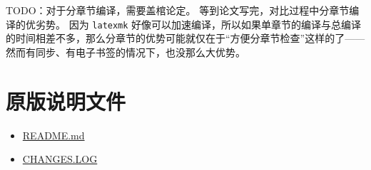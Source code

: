 \documentclass[../Main/thesis.tex]{subfiles}
\begin{document}
TODO：对于分章节编译，需要盖棺论定。
等到论文写完，对比过程中分章节编译的优劣势。 因为 \texttt{latexmk}
好像可以加速编译，所以如果单章节的编译与总编译的时间相差不多，那么分章节的优势可能就仅在于``方便分章节检查''这样的了------然而有同步、有电子书签的情况下，也没那么大优势。

\section{原版说明文件}

\begin{itemize}
\item
  \href{https://github.com/marquistj13/TongjiThesis/blob/master/README.md}{README.md}
\item
  \href{https://github.com/marquistj13/TongjiThesis/blob/master/changes.md}{CHANGES.LOG}
\end{itemize}
\end{document}
